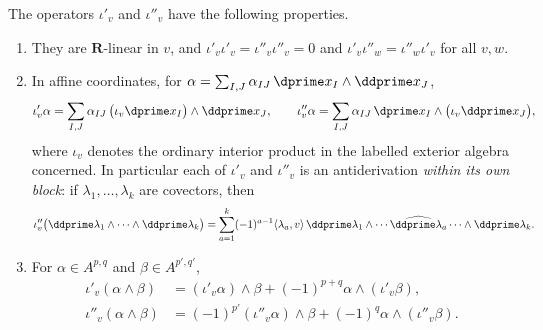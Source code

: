 \begin{lemma}
\label{lem:ch11-contraction-basic}
The operators $\iota'_v$ and $\iota''_v$ have the following properties.
\begin{enumerate}
\item\label{itm:ch11-contr:linear}
  They are $\mathbf R$-linear in $v$, and
  $\iota'_v\iota'_v=\iota''_v\iota''_v=0$ and
  $\iota'_v\iota''_w=\iota''_w\iota'_v$ for all $v,w$.
\item\label{itm:ch11-contr:coord}
  In affine coordinates, for
  $\alpha=\sum_{I,J}\alpha_{IJ}\,\dprime x_I\wedge\ddprime x_J$,
  \[
   \iota'_v\alpha
   =\sum_{I,J}\alpha_{IJ}\,\bigl(\iota_v\dprime x_I\bigr)
     \wedge\ddprime x_J,
   \qquad
   \iota''_v\alpha
   =\sum_{I,J}\alpha_{IJ}\,\dprime x_I\wedge
     \bigl(\iota_v\ddprime x_J\bigr),
  \]
  where $\iota_v$ denotes the ordinary interior product in the labelled
  exterior algebra concerned.  In particular each of $\iota'_v$ and
  $\iota''_v$ is an antiderivation \emph{within its own block}: if
  $\lambda_1,\ldots,\lambda_k$ are covectors, then
  \[
   \iota''_v\bigl(\ddprime\lambda_1\wedge\cdots\wedge\ddprime\lambda_k\bigr)
   =\sum_{a=1}^k(-1)^{a-1}\langle\lambda_a,v\rangle\,
     \ddprime\lambda_1\wedge\cdots\widehat{\ddprime\lambda_a}\cdots
     \wedge\ddprime\lambda_k .
  \]
  \item\label{itm:ch11-contr:leibniz}
  For $\alpha\in A^{p,q}$ and $\beta\in A^{p',q'}$,
  \[
   \begin{aligned}
   \iota'_v(\alpha\wedge\beta)
     &=(\iota'_v\alpha)\wedge\beta
       +(-1)^{p+q}\alpha\wedge(\iota'_v\beta),\\
   \iota''_v(\alpha\wedge\beta)
     &=(-1)^{p'}(\iota''_v\alpha)\wedge\beta
       +(-1)^{q}\alpha\wedge(\iota''_v\beta).
   \end{aligned}
  \]
\end{enumerate}
\end{lemma}

